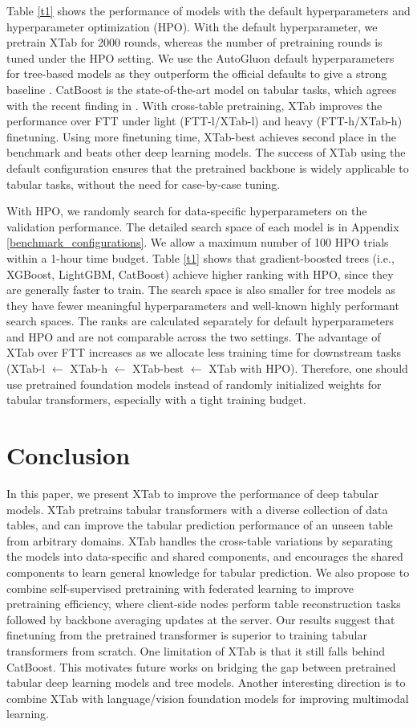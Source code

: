 Table \ref{t1} shows the performance of models with the default hyperparameters and hyperparameter optimization (HPO). With the default hyperparameter, we pretrain XTab for 2000 rounds, whereas the number of pretraining rounds is tuned under the HPO setting. We use the AutoGluon default hyperparameters for tree-based models as they outperform the official defaults to give a strong baseline \citep{erickson2020autogluon}. CatBoost is the state-of-the-art model on tabular tasks, which agrees with the recent finding in \citet{grinsztajn2022tree}. With cross-table pretraining, XTab improves the performance over FTT under light (FTT-l/XTab-l) and heavy (FTT-h/XTab-h) finetuning. Using more finetuning time, XTab-best achieves second place in the benchmark and beats other deep learning models. The success of XTab using the default configuration ensures that the pretrained backbone is widely applicable to tabular tasks, without the need for case-by-case tuning.

With HPO, we randomly search for data-specific hyperparameters on the validation performance. The detailed search space of each model is in Appendix \ref{benchmark_configurations}. We allow a maximum number of 100 HPO trials within a 1-hour time budget. Table \ref{t1} shows that gradient-boosted trees (i.e., XGBoost, LightGBM, CatBoost) achieve higher ranking with HPO, since they are generally faster to train. The search space is also smaller for tree models as they have fewer meaningful hyperparameters and well-known highly performant search spaces. The ranks are calculated separately for default hyperparameters and HPO and  are not comparable across the two settings. The advantage of XTab over FTT increases as we allocate less training time for downstream tasks (XTab-l $\leftarrow$ XTab-h $\leftarrow$ XTab-best $\leftarrow$ XTab with HPO). Therefore, one should use pretrained foundation models instead of randomly initialized weights for tabular transformers, especially with a tight training budget. 

\section{Conclusion} 
In this paper, we present XTab to improve the performance of deep tabular models. XTab pretrains tabular transformers with a diverse collection of data tables, and can improve the tabular prediction performance of an unseen table from arbitrary domains. XTab handles the cross-table variations by separating the models into data-specific and shared components, and encourages the shared components to learn general knowledge for tabular prediction. We also propose to combine self-supervised pretraining with federated learning to improve pretraining efficiency, where client-side nodes perform table reconstruction tasks followed by backbone averaging updates at the server. Our results suggest that finetuning from the pretrained transformer is superior to training tabular transformers from scratch. One limitation of XTab is that it still falls behind CatBoost. This motivates  future works on bridging the gap between pretrained tabular deep learning models and tree models. Another interesting  direction is to combine XTab with language/vision foundation models for improving multimodal learning.

